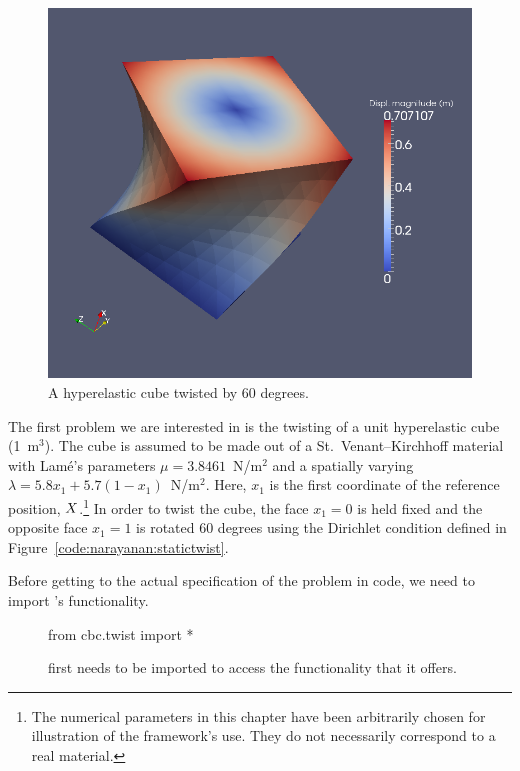 \begin{figure}[ht]
  \begin{center}
    \includegraphics{chapters/narayanan/images/png/twistedcube.png}
  \end{center}
  \caption{A hyperelastic cube twisted by 60 degrees.}
    \label{fig:narayanan:twistedcube}
\end{figure}

The first problem we are interested in is the twisting of a unit
hyperelastic cube (1~m$^3$). The cube is assumed to be made out of a
St.~Venant--Kirchhoff material with Lam\'e's parameters $\mu =
3.8461$~N/m$^2$ and a spatially varying $\lambda = 5.8 x_{1} + 5.7 (1
- x_{1})$~N/m$^2$. Here, $x_{1}$ is the first coordinate of the
reference position, $\mbox{$ X$}$.\footnote{The numerical parameters in this
chapter have been arbitrarily chosen for illustration of the
framework's use. They do not necessarily correspond to a real
material.} In order to twist the cube, the face $x_{1} = 0$ is held
fixed and the opposite face $x_{1} = 1$ is rotated 60 degrees using
the Dirichlet condition defined in
Figure~\ref{code:narayanan:statictwist}.

Before getting to the actual specification of the problem in code, we
need to import \twist's functionality.

\begin{figure}[ht]
\begin{python}
from cbc.twist import *
\end{python}
\caption{\twist{} first needs to be imported to access the
  functionality that it offers.}
\end{figure}

